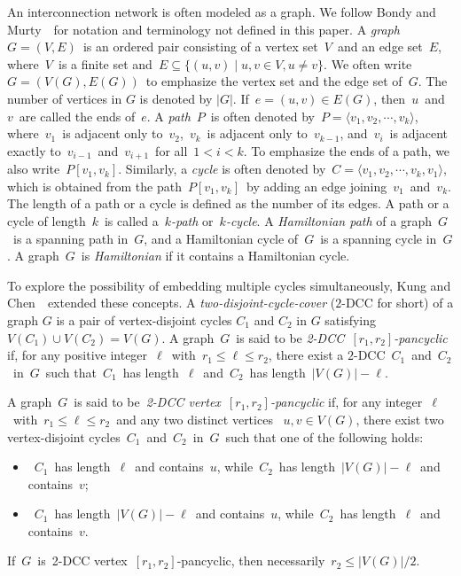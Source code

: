 \documentclass[12pt,a4paper]{amsart}
\theoremstyle{definition}
\begin{document}
   An interconnection network is often modeled as a graph. We follow Bondy and Murty~\cite{BM08}~for notation and terminology not defined in this paper. A {\em graph}~$G=(V,E)$~is an ordered pair consisting of a vertex set~$V$~and an edge set~$E$, where~$V$~is a finite set and~$E\subseteq\{(u,v)\mid u,v\in V,u\neq v\}$. We often write~$G=(V(G),E(G))$~to emphasize the vertex set and the edge set of~$G$. The number of vertices in $G$ is denoted by $|G|$. If~$e=(u,v)\in E(G)$, then~$u$~and~$v$~are called the ends of~$e$. A {\em path}~$P$~is often denoted by~$P=\langle v_1,v_2,\cdots,v_k\rangle$, where~$v_1$~is adjacent only to~$v_2$,~$v_k$~is adjacent only to~$v_{k-1}$, and~$v_i$~is adjacent exactly to~$v_{i-1}$~and~$v_{i+1}$~for all~$1<i<k$. To emphasize the ends of a path, we also write~$P[v_1,v_k]$. Similarly, a {\em cycle} is often denoted by~$C=\langle v_1,v_2,\cdots,v_k,v_1\rangle$, which is obtained from the path~$P[v_1,v_k]$~by adding an edge joining~$v_1$~and~$v_k$. The length of a path or a cycle is defined as the number of its edges. A path or a cycle of length~$k$~is called a~{\em $k$-path} or~{\em $k$-cycle}. A {\em Hamiltonian path} of a graph~$G$~is a spanning path in~$G$, and a Hamiltonian cycle of~$G$~is a spanning cycle in~$G$. A graph~$G$~is {\em Hamiltonian} if it contains a Hamiltonian cycle.

	To explore the possibility of embedding multiple cycles simultaneously, Kung and Chen~\cite{KC15}~extended these concepts.
	A {\em two-disjoint-cycle-cover} ($2$-DCC for short) of a graph $G$ is a pair of vertex-disjoint cycles $C_1$ and $C_2$ in $G$ satisfying $V(C_1)\cup V(C_2)=V(G)$.	A graph~$G$~is said to be {\em 2-DCC~$[r_1,r_2]$-pancyclic} if, for any positive integer~$\ell$~with~$r_1\le \ell\le r_2$,
	there exist a $2$-DCC~$C_1$~and~$C_2$~in~$G$~such that~$C_1$~has length~$\ell$~and~$C_2$~has length~$|V(G)|-\ell$.
	
	A graph~$G$~is said to be~{\em 2-DCC vertex~$[r_1,r_2]$-pancyclic} if, for any integer~$\ell$~with~$r_1\le \ell\le r_2$~and any two distinct vertices
	~$u,v\in V(G)$, there exist two vertex-disjoint cycles~$C_1$~and~$C_2$~in~$G$~such that one of the following holds:
	\medskip
	\begin{itemize}[label=\textbullet,leftmargin=*]
		\item~$C_1$~has length~$\ell$~and contains~$u$, while~$C_2$~has length~$|V(G)|-\ell$~and contains~$v$;
		\item~$C_1$~has length~$|V(G)|-\ell$~and contains~$u$, while~$C_2$~has length~$\ell$~and contains~$v$.
	\end{itemize}
	\medskip
	If~$G$~is~2-DCC vertex~$[r_1,r_2]$-pancyclic, then necessarily~$r_2\le |V(G)|/2$.
	
\end{document}

